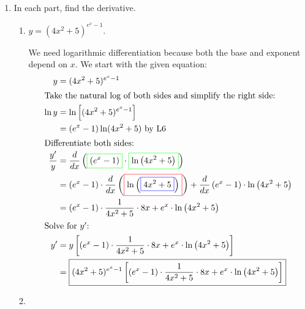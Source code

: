 \documentclass[main]{subfiles}
\begin{document}
\begin{enumerate}[resume]
\item  In each part, find the derivative.

  \begin{enumerate}

  \item
    \begin{problem}[\stretch{1}]
      $y = (4x^2 + 5)^{e^x-1}$.      
    \end{problem}

    \begin{solution}
      We need logarithmic differentiation because both the base and
      exponent depend on $x$.  We start with the given equation: 
      \begin{align*}
        y &= (4x^2 + 5)^{e^x-1} \\
        \intertext{Take the natural log of both sides and simplify the
          right side:}
        \ln y &= \ln \left[ (4x^2 + 5)^{e^x - 1} \right] \\
        &= (e^x - 1) \ln (4x^2 + 5) \text{ by {L6}} \\
        \intertext{Differentiate both sides:} %
        \frac{y'}{y} &= \frac{d}{dx} \left(\fcolorbox{green}{white}{$\displaystyle  \left(e^ { x} -1\right)$}\cdot \fcolorbox{green}{white}{$\displaystyle  \ln\left(4 x^ { 2} + 5\right)$}\right) \\
        &= \left(e^ { x} -1\right)\cdot \frac{d}{dx} \left(\fcolorbox{red}{white}{$\displaystyle \ln\left(\fcolorbox{blue}{white}{$\displaystyle 4 x^ { 2} + 5$}\right)$}\right)+ \frac{d}{dx}\left(e^ { x} -1\right)\cdot \ln\left(4 x^ { 2} + 5\right) \\
        &= \left(e^ { x} -1\right)\cdot \frac{1}{4 x^ { 2} + 5}\cdot 8 x +
        e^ { x} \cdot \ln\left(4 x^ { 2} + 5\right) \\
        \shortintertext{Solve for $y'$:} %
        y' &= y \left[ \left(e^ { x} -1\right)\cdot \frac{1}{4 x^ {
              2} + 5}\cdot 8 x + e^ { x} \cdot \ln\left(4 x^ { 2} +
            5\right) \right] \\
        &= \boxed{(4x^2 + 5)^{e^x-1} \left[ \left(e^ { x} -1\right)\cdot
            \frac{1}{4 x^ { 2} + 5}\cdot 8 x + e^ { x} \cdot \ln\left(4 x^
              { 2} + 5\right) \right]}
      \end{align*}
    \end{solution}

  \item


\end{enumerate}
\end{enumerate}
\end{document}
